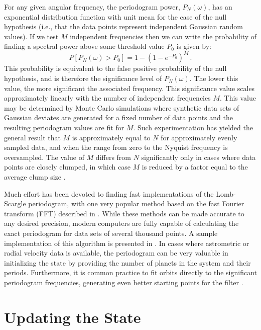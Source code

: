 For any given angular frequency, the periodogram power, $P_N(\omega)$, has an exponential distribution function with unit mean for the case of the null hypothesis (i.e., that the data points represent independent Gaussian random values).  If we test $M$ independent frequencies then we can write the probability of finding a spectral power above some threshold value $P_0$ is given by:
\begin{equation}
P\left[P_N(\omega) > P_0\right] = 1 - \left(1 - e^{-P_0}\right)^M \,.
\end{equation}
This probability is equivalent to the false positive probability of the null hypothesis, and is therefore the significance level of $P_N(\omega)$.  The lower this value, the more significant the associated frequency.  This significance value scales approximately linearly with the number of independent frequencies $M$.  This value may be determined by Monte Carlo simulations where synthetic data sets of Gaussian deviates are generated for a fixed number of data points and the resulting periodogram values are fit for $M$.  Such experimentation has yielded the general result that $M$ is approximately equal to $N$ for approximately evenly sampled data, and when the range from zero to the Nyquist frequency is oversampled.  The value of $M$ differs from $N$ significantly only in cases where data points are closely clumped, in which case $M$ is reduced by a factor equal to the average clump size \citep{horne1986prescription,press1992numerical}.

Much effort has been devoted to finding fast implementations of the Lomb-Scargle periodogram, with one very popular method based on the fast Fourier transform (FFT) described in \citet{press1989fast}.  While these methods can be made accurate to any desired precision, modern computers are fully capable of calculating the exact periodogram for data sets of several thousand points.  A sample implementation of this algorithm is presented in .  In cases where astrometric or radial velocity data is available, the periodogram can be very valuable in initializing the state by providing the number of planets in the system and their periods.  Furthermore, it is common practice to fit orbits directly to the significant periodogram frequencies, generating even better starting points for the filter \citep{sozzetti2002,sozzetti2003}.


\section{Updating the State}\label{sec:state_update}

